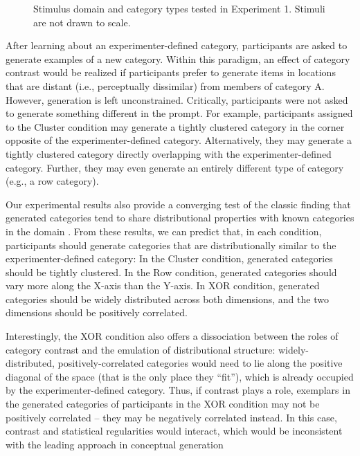 \documentclass[12pt]{article}
\newcommand\inputpgf[2]{{
\let\pgfimageWithoutPath\pgfimage
\renewcommand{\pgfimage}[2][]{\pgfimageWithoutPath[##1]{#1/##2}}

}}
\begin{document}
\begin{flushleft}
\begin{figure}
    \begin{center} \inputpgf{figs/}{e1-conditions.pgf}
    \caption{Stimulus domain and category types tested in Experiment 1. Stimuli
are not drawn to scale.}
    \label{fig:e1-conditions}
    \end{center}
\end{figure}

After learning about an experimenter-defined category, participants are asked to
generate examples of a new category. Within this paradigm, an effect of category
contrast would be realized if participants prefer to generate items in locations
that are distant (i.e., perceptually dissimilar) from members of category A.
However, generation is left unconstrained. Critically, participants were not
asked to generate something different in the prompt. For example, participants
assigned to the Cluster condition may generate a tightly clustered category in
the corner opposite of the experimenter-defined category. Alternatively, they
may generate a tightly clustered category directly overlapping with the
experimenter-defined category. Further, they may even generate an entirely
different type of category (e.g., a row category).

Our experimental results also provide a converging test of the classic finding
that generated categories tend to share distributional properties with known
categories in the domain \citep{jern2013probabilistic,ward1994structured}. From
these results, we can predict that, in each condition, participants should
generate categories that are distributionally similar to the
experimenter-defined category: In the Cluster condition, generated categories
should be tightly clustered. In the Row condition, generated categories should
vary more along the X-axis than the Y-axis. In XOR condition, generated
categories should be widely distributed across both dimensions, and the two
dimensions should be positively correlated.

Interestingly, the XOR condition also offers a dissociation between the roles of
category contrast and the emulation of distributional structure:
widely-distributed, positively-correlated categories would need to lie along the
positive diagonal of the space (that is the only place they ``fit''), which is
already occupied by the experimenter-defined category. Thus, if contrast plays a
role, exemplars in the generated categories of participants in the XOR condition
may not be positively correlated -- they may be negatively correlated instead.
In this case, contrast and statistical regularities would interact, which would
be inconsistent with the leading approach in conceptual generation
\citep{jern2013probabilistic}



\end{flushleft}
\end{document}
